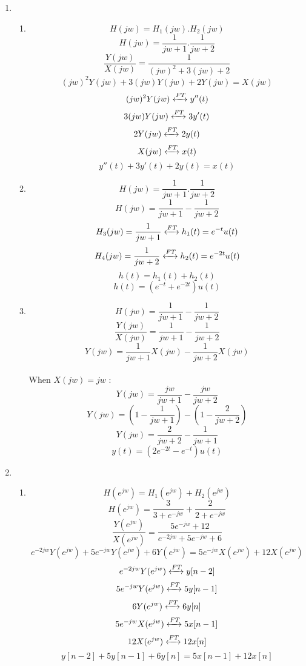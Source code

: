 \documentclass[10pt,a4paper, margin=1in]{article}
\begin{document}
\begin{enumerate}
\item %
    \begin{enumerate}
    \item %
        \[ H(jw) = H_1(jw) . H_2(jw)\]
        \[ H(jw) = \frac{1}{jw+1} . \frac{1}{jw+2}\]
        \[ \frac{Y(jw)}{X(jw)} = \frac{1}{(jw)^2 + 3(jw) + 2}\]
        \[ (jw)^2Y(jw) + 3(jw)Y(jw) + 2Y(jw) = X(jw)\]
        \[ (jw)^2Y(jw) \xleftrightarrow{FT} y''(t) \]
        \[ 3(jw)Y(jw) \xleftrightarrow{FT} 3y'(t) \]
        \[ 2Y(jw) \xleftrightarrow{FT} 2y(t) \]
        \[ X(jw) \xleftrightarrow{FT} x(t)\]
        \[ y''(t) + 3y'(t) + 2y(t) = x(t)\]
        
    \item %
        \[ H(jw) = \frac{1}{jw+1} . \frac{1}{jw+2}\]
        \[ H(jw) = \frac{1}{jw+1} - \frac{1}{jw+2}\]
        \[ H_3(jw) = \frac{1}{jw+1} \xleftrightarrow{FT} h_1(t) = e^{-t}u(t)\]
        \[ H_4(jw) = \frac{1}{jw+2} \xleftrightarrow{FT} h_2(t) = e^{-2t}u(t)\]
        \[ h(t) = h_1(t) + h_2(t)\]
        \[ h(t) = (e^{-t} + e^{-2t})u(t)\]
        
    \item %
        \[ H(jw) = \frac{1}{jw+1} - \frac{1}{jw+2}\]
        \[ \frac{Y(jw)}{X(jw)} = \frac{1}{jw+1} - \frac{1}{jw+2}\]
        \[ Y(jw) = \frac{1}{jw+1}X(jw) - \frac{1}{jw+2}X(jw)\]
        \\ When $X(jw) = jw$ :
        \[ Y(jw) =\frac{jw}{jw+1} - \frac{jw}{jw+2} \]
        \[ Y(jw) = \left( 1-\frac{1}{jw+1} \right) - \left(1 - \frac{2}{jw+2} \right)\]
        \[ Y(jw) = \frac{2}{jw+2} - \frac{1}{jw+1}\]
        \[ y(t) = (2e^{-2t} - e^{-t})u(t)\]
\end{enumerate}

\item %
    \begin{enumerate}   
    \item %
        \[ H(e^{jw}) = H_1(e^{jw}) + H_2(e^{jw})\]
        \[ H(e^{jw}) = \frac{3}{3+e^{-jw}} + \frac{2}{2+e^{-jw}}\]
        \[ \frac{Y(e^{jw})}{X(e^{jw})} = \frac{5e^{-jw} + 12}{e^{-2jw} + 5e^{-jw} + 6}\]
        \[ e^{-2jw}Y(e^{jw}) + 5e^{-jw}Y(e^{jw}) + 6Y(e^{jw}) = 5e^{-jw}X(e^{jw}) + 12X(e^{jw}) \]
        \[ e^{-2jw}Y(e^{jw}) \xleftrightarrow{FT} y[n-2]\]
        \[ 5e^{-jw}Y(e^{jw}) \xleftrightarrow{FT} 5y[n-1]\]
        \[ 6Y(e^{jw}) \xleftrightarrow{FT} 6y[n]\]
        \[ 5e^{-jw}X(e^{jw}) \xleftrightarrow{FT} 5x[n-1]\]
        \[ 12X(e^{jw}) \xleftrightarrow{FT} 12x[n]\]
        \[ y[n-2] + 5y[n-1] + 6y[n] = 5x[n-1] + 12x[n]\]
        

\end{enumerate}
\end{enumerate}
\end{document}
